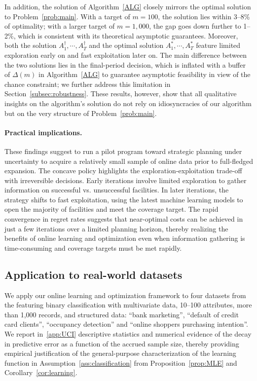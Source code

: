 \documentclass[nonblindrev]{informs3noheader}
\begin{document}
In addition, the solution of Algorithm~\ref{ALG} closely mirrors the optimal solution to Problem~\eqref{prob:main}. With a target of $m=100$, the solution lies within 3--8\% of optimality; with a larger target of $m=1,000$, the gap goes down further to 1--2\%, which is consistent with its theoretical asymptotic guarantees. Moreover, both the solution $A^\dagger_1,\cdots,A^\dagger_T$ and the optimal solution $A^*_1,\cdots,A^*_T$ feature limited exploration early on and fast exploitation later on. The main difference between the two solutions lies in the final-period decision, which is inflated with a buffer of $\Delta(m)$ in Algorithm~\ref{ALG} to guarantee asymptotic feasibility in view of the chance constraint; we further address this limitation in Section~\ref{subsec:robustness}. These results, however, show that all qualitative insights on the algorithm's solution do not rely on idiosyncracies of our algorithm but on the very structure of Problem~\eqref{prob:main}.

\paragraph{Practical implications.}
These findings suggest to run a pilot program toward strategic planning under uncertainty to acquire a relatively small sample of online data prior to full-fledged expansion. The concave policy highlights the exploration-exploitation trade-off with irreversible decisions. Early iterations involve limited exploration to gather information on successful vs. unsuccessful facilities. In later iterations, the strategy shifts to fast exploitation, using the latest machine learning models to open the majority of facilities and meet the coverage target. The rapid convergence in regret rates suggests that near-optimal costs can be achieved in just a few iterations over a limited planning horizon, thereby realizing the benefits of online learning and optimization even when information gathering is time-consuming and coverage targets must be met rapidly.

\subsection{Application to real-world datasets}
\label{subsec:UCI}

We apply our online learning and optimization framework to four datasets from the \cite{UCI} featuring binary classification with multivariate data, 10--100 attributes, more than 1,000 records, and structured data: ``bank marketing'', ``default of credit card clients'', ``occupancy detection'' and ``online shoppers purchasing intention''. We report in~\ref{app:UCI} descriptive statistics and numerical evidence of the decay in predictive error as a function of the accrued sample size, thereby providing empirical justification of the general-purpose characterization of the learning function in Assumption~\ref{ass:classification} from Proposition~\ref{prop:MLE} and Corollary~\ref{cor:learning}.
\end{document}
